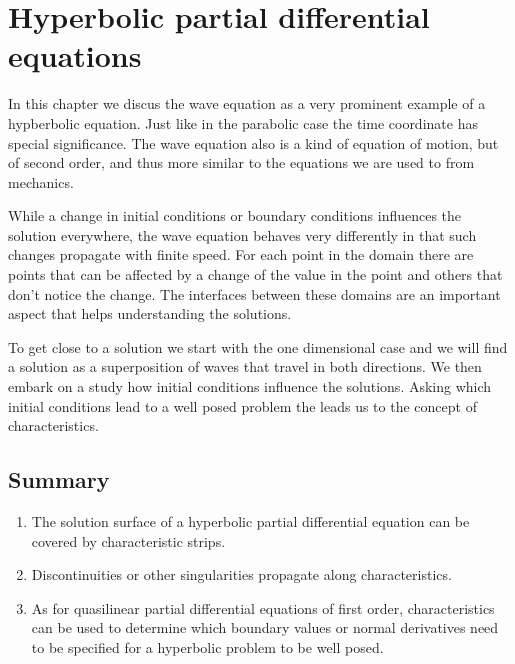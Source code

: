 %
%
%
\chapter{Hyperbolic partial differential equations
\label{chapter-hyperbolisch}}
\rhead{}
In this chapter we discus the wave equation as a very prominent
example of a hypberbolic equation.
Just like in the parabolic case the time coordinate has special
significance.
The wave equation also is a kind of equation of motion, but of second
order, and thus more similar to the equations we are used to from
mechanics.

While a change in initial conditions or boundary conditions 
influences the solution everywhere, the wave equation behaves
very differently in that such changes propagate with finite speed.
For each point in the domain there are points that can be affected
by a change of the value in the point and others that don't notice
the change.
The interfaces between these domains are an important aspect that
helps understanding the solutions.

To get close to a solution we start with the one dimensional case
and we will find a solution as a superposition of waves that travel in
both directions.
We then embark on a study how initial conditions influence the solutions.
Asking which initial conditions lead to a well posed problem the
leads us to the concept of characteristics.









\section{Summary}
\begin{enumerate}
\item
The solution surface of a hyperbolic partial differential equation can be
covered by characteristic strips.
\item
Discontinuities or other singularities propagate along characteristics.
\item
As for quasilinear partial differential equations of first order,
characteristics can be used to determine which boundary values or
normal derivatives need to be specified for a hyperbolic problem to
be well posed.
\end{enumerate}

